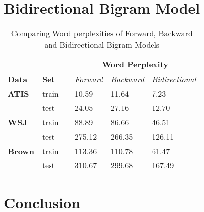 \documentclass{article}
\begin{document}
\section{Bidirectional Bigram Model}
\begin{table}[h]
\centering
\begin{tabular}{@{}llllll@{}}
\toprule
\textbf{}      & \textbf{}    &  & \multicolumn{3}{c}{\textbf{Word Perplexity}}                  \\ \midrule
\textbf{Data}  & \textbf{Set} &  & \textit{Forward} & \textit{Backward} & \textit{Bidirectional} \\ \midrule
\textbf{ATIS}  & train        &  & 10.59           & 11.64             & 7.23                  \\ \midrule
               & test         &  & 24.05           & 27.16            & 12.70                 \\ \midrule
\textbf{WSJ}   & train        &  & 88.89           & 86.66            & 46.51                 \\ \midrule
               & test         &  & 275.12           & 266.35           & 126.11                \\ \midrule
\textbf{Brown} & train        &  & 113.36          & 110.78            & 61.47                  \\ \midrule
               & test         &  & 310.67          & 299.68           & 167.49               \\ \bottomrule
\end{tabular}
\caption{Comparing Word perplexities of Forward, Backward and Bidirectional Bigram Models}
\label{all}
\end{table}
\section{Conclusion}
\end{document}
